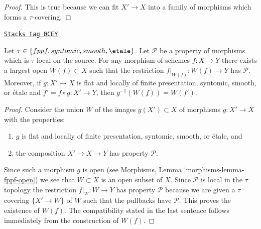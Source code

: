 \begin{proof}
This is true because we can fit $X' \to X$ into a family of
morphisms which forms a $\tau$-covering.
\end{proof}

\begin{lemma}
\label{descent-lemma-largest-open-of-the-source}
\href{https://stacks.math.columbia.edu/tag/0CEY}{\texttt{Stacks tag 0CEY}}

Let $\tau \in \{fppf, syntomic, smooth, \etale\}$.
Let $\mathcal{P}$ be a property of morphisms which is $\tau$ local
on the source. For any morphism of schemes $f : X \to Y$ there exists
a largest open $W(f) \subset X$ such that the restriction
$f|_{W(f)} : W(f) \to Y$ has $\mathcal{P}$. Moreover,
if $g : X' \to X$ is flat and locally of finite presentation,
syntomic, smooth, or \'etale and $f' = f \circ g : X' \to Y$, then
$g^{-1}(W(f)) = W(f')$.
\end{lemma}

\begin{proof}
Consider the union $W$ of the images $g(X') \subset X$ of
morphisms $g : X' \to X$ with the properties:
\begin{enumerate}
\item $g$ is flat and locally of finite presentation, syntomic,
smooth, or \'etale, and
\item the composition $X' \to X \to Y$ has property $\mathcal{P}$.
\end{enumerate}
Since such a morphism $g$ is open (see
Morphisms, Lemma \ref{morphisms-lemma-fppf-open})
we see that $W \subset X$ is an open subset of $X$. Since $\mathcal{P}$
is local in the $\tau$ topology the restriction $f|_W : W \to Y$ has property
$\mathcal{P}$ because we are given a $\tau$ covering $\{X' \to W\}$ of $W$
such that the pullbacks have $\mathcal{P}$. This proves the existence of $W(f)$.
The compatibility stated in the last sentence follows immediately
from the construction of $W(f)$.
\end{proof}

